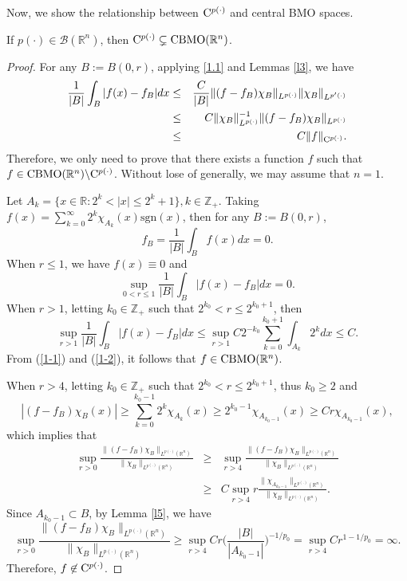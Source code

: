 \documentclass{amse-new}
\numberwithin{equation}{section} %
\begin{document}
Now, we show the relationship between ${\rm C}^{p(\cdot)}$ and central {\rm BMO} spaces.
\begin{proposition}\label{p1}
If $p(\cdot)\in \mathcal{B}(\mathbb{R}^n)$, then ${\rm C}^{p(\cdot)}\subsetneq {\rm CBMO}(\mathbb{R}^n)$.
\end{proposition}
\begin{proof}
For any $B:=B(0,r)$, applying \eqref{1.1} and Lemmas \ref{l3}, we have
\begin{eqnarray*}
\frac{1}{|B|}\int_{B}|f(x)-f_{B}|dx&\leq&\frac{C}{|B|}\|(f-f_{B})\chi_{B}\|_{L^{p(\cdot)}}\|\chi_{B}\|_{L^{p'(\cdot)}}\\
&\leq&C\|\chi_{B}\|^{-1}_{L^{p(\cdot)}}\|(f-f_{B})\chi_{B}\|_{L^{p(\cdot)}}\\
&\leq&C\|f\|_{{\rm C}^{p(\cdot)}}.
\end{eqnarray*}
Therefore, we only need to prove that there exists a function $f$ such that $f \in {\rm CBMO}(\mathbb{R}^n)\backslash {\rm C}^{p(\cdot)}$. Without lose of generally, we may assume that $n=1$.

Let $A_{k}=\{x\in \mathbb{R}: 2^{k}<|x|\leq 2^{k}+1\}, k\in \mathbb{Z}_{+}$. Taking $f(x)=\sum_{k=0}^{\infty}2^{k}\chi_{A_{k}}(x)\mathrm{sgn}(x)$, then for any $B:=B(0,r)$,
$$f_{B}=\frac{1}{|B|}\int_{B}f(x)dx=0.$$
When $r\leq 1$, we have $f(x)\equiv 0$ and
\begin{equation}\label{1-1}
\sup_{0<r\leq 1}\frac{1}{|B|}\int_{B}|f(x)-f_{B}|dx=0.
\end{equation}
When $r>1$, letting $k_{0}\in \mathbb{Z}_{+}$ such that $2^{k_{0}}<r\leq 2^{k_{0}+1}$, then
\begin{equation}\label{1-2}
\sup_{r>1}\frac{1}{|B|}\int_{B}|f(x)-f_{B}|dx\leq \sup_{r>1}C2^{-k_{0}}\sum^{k_{0}+1}_{k=0}\int_{A_{k}}2^{k}dx\leq C.
\end{equation}
From (\ref{1-1}) and (\ref{1-2}), it follows that $f\in {\rm CBMO}(\mathbb{R}^n)$.

When $r>4$, letting $k_{0}\in \mathbb{Z}_{+}$ such that $2^{k_{0}}<r\leq 2^{k_{0}+1}$, thus $k_{0}\geq 2$ and
$$|(f-f_{B})\chi_{B}(x)|\geq \sum_{k=0}^{k_{0}-1}2^{k}\chi_{A_{k}}(x)\geq 2^{k_{0}-1}\chi_{A_{k_{0}-1}}(x)\geq Cr\chi_{A_{k_{0}-1}}(x),$$
which implies that
\begin{eqnarray*}
\sup_{r>0}\frac{\|(f-f_{B})\chi_{B}\|_{L^{p(\cdot)}(\mathbb{R}^n)}}{\|\chi_{B}\|_{L^{p(\cdot)}(\mathbb{R}^n)}}
&\geq& \sup_{r>4}\frac{\|(f-f_{B})\chi_{B}\|_{L^{p(\cdot)}(\mathbb{R}^n)}}{\|\chi_{B}\|_{L^{p(\cdot)}(\mathbb{R}^n)}}\\
&\geq& C\sup_{r>4}r\frac{\|\chi_{A_{k_{0}-1}}\|_{L^{p(\cdot)}(\mathbb{R}^n)}}{\|\chi_{B}\|_{L^{p(\cdot)}(\mathbb{R}^n)}}.
\end{eqnarray*}
Since $A_{k_{0}-1}\subset B$, by Lemma \ref{l5}, we have
$$\sup_{r>0}\frac{\|(f-f_{B})\chi_{B}\|_{L^{p(\cdot)}(\mathbb{R}^n)}}{\|\chi_{B}\|_{L^{p(\cdot)}(\mathbb{R}^n)}}\geq \sup_{r>4}Cr\bigg(\frac{|B|}{|A_{k_{0}-1}|}\bigg)^{-1/p_{0}}=\sup_{r>4}Cr^{1-1/p_{0}}=\infty.$$
Therefore, $f\not\in {\rm C}^{p(\cdot)}$.
\end{proof}
\end{document}
